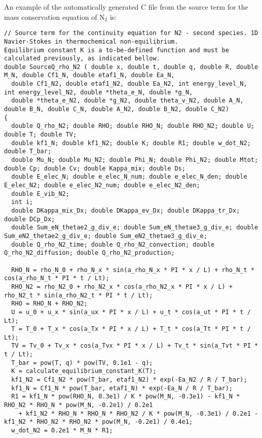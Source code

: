\documentclass[10pt]{article}
\begin{document}
An example of the automatically generated C file from the source term for the mass conservation equation of N$_2$ is:
\begin{scriptsize}
 \begin{verbatim}
// Source term for the continuity equation for N2 - second species. 1D Navier-Stokes in thermochemical non-equilibrium. 
Equilibrium constant K is a to-be-defined function and must be calculated previously, as indicated bellow.
double SourceQ_rho_N2 ( double x, double t, double q, double R, double M_N, double Cf1_N, double etaf1_N, double Ea_N,
  double Cf1_N2, double etaf1_N2, double Ea_N2, int energy_level_N, int energy_level_N2, double *theta_e_N, double *g_N,
  double *theta_e_N2, double *g_N2, double theta_v_N2, double A_N, double B_N, double C_N, double A_N2, double B_N2, double C_N2)
{
  double Q_rho_N2; double RHO; double RHO_N; double RHO_N2; double U; double T; double TV;
  double kf1_N; double kf1_N2; double K; double R1; double w_dot_N2; double T_bar;
  double Mu_N; double Mu_N2; double Phi_N; double Phi_N2; double Mtot; double Cp; double Cv; double Kappa_mix; double Ds;
  double E_elec_N; double e_elec_N_num; double e_elec_N_den; double E_elec_N2; double e_elec_N2_num; double e_elec_N2_den;
  double E_vib_N2;
  int i;
  double DKappa_mix_Dx; double DKappa_ev_Dx; double DKappa_tr_Dx; double DCp_Dx;
  double Sum_eN_thetae2_g_div_e; double Sum_eN_thetae3_g_div_e; double Sum_eN2_thetae2_g_div_e; double Sum_eN2_thetae3_g_div_e;
  double Q_rho_N2_time; double Q_rho_N2_convection; double Q_rho_N2_diffusion; double Q_rho_N2_production;

  RHO_N = rho_N_0 + rho_N_x * sin(a_rho_N_x * PI * x / L) + rho_N_t * cos(a_rho_N_t * PI * t / Lt);
  RHO_N2 = rho_N2_0 + rho_N2_x * cos(a_rho_N2_x * PI * x / L) + rho_N2_t * sin(a_rho_N2_t * PI * t / Lt);
  RHO = RHO_N + RHO_N2;
  U = u_0 + u_x * sin(a_ux * PI * x / L) + u_t * cos(a_ut * PI * t / Lt);
  T = T_0 + T_x * cos(a_Tx * PI * x / L) + T_t * cos(a_Tt * PI * t / Lt);
  TV = Tv_0 + Tv_x * cos(a_Tvx * PI * x / L) + Tv_t * sin(a_Tvt * PI * t / Lt);
  T_bar = pow(T, q) * pow(TV, 0.1e1 - q);
  K = calculate_equilibrium_constant_K(T);
  kf1_N2 = Cf1_N2 * pow(T_bar, etaf1_N2) * exp(-Ea_N2 / R / T_bar);
  kf1_N = Cf1_N * pow(T_bar, etaf1_N) * exp(-Ea_N / R / T_bar);
  R1 = kf1_N * pow(RHO_N, 0.3e1) / K * pow(M_N, -0.3e1) - kf1_N * RHO_N2 * RHO_N * pow(M_N, -0.2e1) / 0.2e1 
	+ kf1_N2 * RHO_N * RHO_N * RHO_N2 / K * pow(M_N, -0.3e1) / 0.2e1 - kf1_N2 * RHO_N2 * RHO_N2 * pow(M_N, -0.2e1) / 0.4e1;
  w_dot_N2 = 0.2e1 * M_N * R1;


\end{verbatim}
\end{scriptsize}
\end{document}
